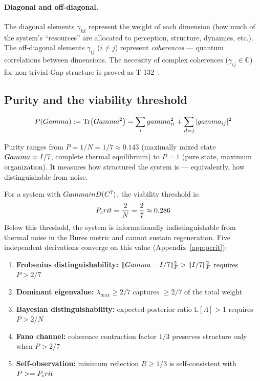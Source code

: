 \paragraph{Diagonal and off-diagonal.}
The diagonal elements $\gamma_{kk}$ represent the weight of each dimension (how much
of the system's ``resources'' are allocated to perception, structure, dynamics, etc.).
The off-diagonal elements $\gamma_{ij}$ ($i \neq j$) represent \emph{coherences} ---
quantum correlations between dimensions. The necessity of complex coherences
($\gamma_{ij} \in \mathbb{C}$) for non-trivial Gap structure is proved as T-132~.

\subsection{Purity and the viability threshold}
\label{subsec:purity}

\begin{definition}[Purity]
\begin{equation}
  P(Gamma) := \Tr(Gamma^2) = \sum_i gamma_{ii}^2 + \sum_{i != j} |gamma_{ij}|^2
  \label{eq:purity}
\end{equation}
\end{definition}

Purity ranges from $P = 1/N = 1/7 \approx 0.143$ (maximally mixed state $Gamma = I/7$,
complete thermal equilibrium) to $P = 1$ (pure state, maximum organization). It measures
how structured the system is --- equivalently, how distinguishable from noise.

\begin{theorembox}
For a system with $Gamma in D(C^7)$, the viability threshold is:
\begin{equation}
  P_crit = \frac{2}{N} = \frac{2}{7} \approx 0.286
  \label{eq:pcrit}
\end{equation}
Below this threshold, the system is informationally indistinguishable from thermal noise
in the Bures metric and cannot sustain regeneration. Five independent derivations converge
on this value (Appendix~\ref{app:pcrit}):
\begin{enumerate}[leftmargin=2em]
  \item \textbf{Frobenius distinguishability:} $\|Gamma - I/7\|_F^2 > \|I/7\|_F^2$
        requires $P > 2/7$
  \item \textbf{Dominant eigenvalue:} $\lambda_{\max} \geq 2/7$ captures $\geq 2/7$
        of the total weight
  \item \textbf{Bayesian distinguishability:} expected posterior ratio
        $\mathbb{E}[\Lambda] > 1$ requires $P > 2/N$
  \item \textbf{Fano channel:} coherence contraction factor $1/3$ preserves structure
        only when $P > 2/7$
  \item \textbf{Self-observation:} minimum reflection $R \geq 1/3$ is self-consistent
        with $P >= P_crit$
\end{enumerate}
\end{theorembox}

